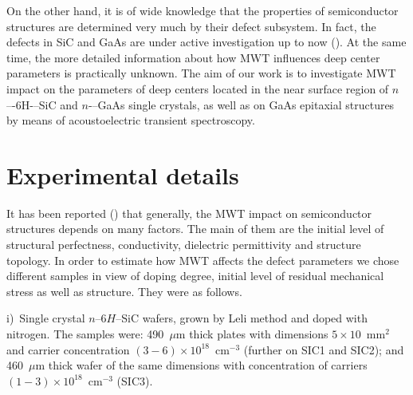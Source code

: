 \documentclass[final,3p,times,twocolumn,authoryear]{elsarticle}
\begin{document}
%


%
%




%



On the other hand, it is of wide knowledge that the properties of semiconductor structures are determined very much by their defect subsystem.
In fact, the defects in SiC and GaAs are under active investigation up to now
(\cite{SiCDavid,SiCWei,GAPel2020,GASobolev2020}).
At the same time,
the more detailed information about how MWT influences deep center parameters is practically unknown.
The aim of our work is to investigate MWT impact on the parameters of deep centers located in the near surface region of $n$–-6H-–SiC and $n$-–GaAs single crystals,
as well as on  GaAs  epitaxial structures by means of acoustoelectric  transient spectroscopy.


\section{Experimental details}\label{sec2}

It has been reported (\cite{BoltovetsEn,Milenin1994En,BelyaevIntac,ASHKINADZE1996,ProcSPIE}) that generally,
the MWT impact on semiconductor structures depends on many factors.
The main of them are the initial level of structural perfectness, conductivity, dielectric permittivity and structure topology.
In order to estimate how MWT affects the defect parameters we chose different samples in view of doping degree, initial level of residual mechanical stress as well as structure.
They were as follows.



\noindent
i)~Single crystal $n$--6$H$--SiC wafers, grown by Leli method and doped with nitrogen.
   The samples were:
    490~$\mu$m thick plates with dimensions $5\times10$~mm$^2$ and  carrier concentration $(3-6)\times10^{18}$~cm$^{-3}$
    (further on SIC1 and SIC2);
    and 460~$\mu$m thick wafer of the same dimensions with concentration of carriers $(1-3)\times10^{18}$~cm$^{-3}$ (SIC3).
\end{document}
